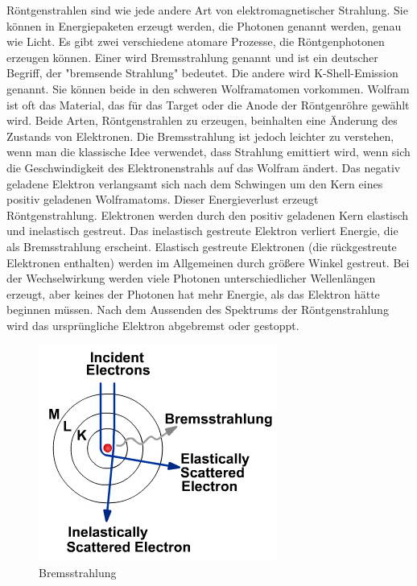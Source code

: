 Röntgenstrahlen sind wie jede andere Art von elektromagnetischer Strahlung. Sie können in Energiepaketen erzeugt werden, die Photonen genannt werden, genau wie Licht. Es gibt zwei verschiedene atomare Prozesse, die Röntgenphotonen erzeugen können. Einer wird Bremsstrahlung genannt und ist ein deutscher Begriff, der "bremsende Strahlung" bedeutet. Die andere wird K-Shell-Emission genannt. Sie können beide in den schweren Wolframatomen vorkommen. Wolfram ist oft das Material, das für das Target oder die Anode der Röntgenröhre gewählt wird.
Beide Arten, Röntgenstrahlen zu erzeugen, beinhalten eine Änderung des Zustands von Elektronen. Die Bremsstrahlung ist jedoch leichter zu verstehen, wenn man die klassische Idee verwendet, dass Strahlung emittiert wird, wenn sich die Geschwindigkeit des Elektronenstrahls auf das Wolfram ändert. Das negativ geladene Elektron verlangsamt sich nach dem Schwingen um den Kern eines positiv geladenen Wolframatoms. Dieser Energieverlust erzeugt Röntgenstrahlung. Elektronen werden durch den positiv geladenen Kern elastisch und inelastisch gestreut. Das inelastisch gestreute Elektron verliert Energie, die als Bremsstrahlung erscheint. Elastisch gestreute Elektronen (die rückgestreute Elektronen enthalten) werden im Allgemeinen durch größere Winkel gestreut. Bei der Wechselwirkung werden viele Photonen unterschiedlicher Wellenlängen erzeugt, aber keines der Photonen hat mehr Energie, als das Elektron hätte beginnen müssen. Nach dem Aussenden des Spektrums der Röntgenstrahlung wird das ursprüngliche Elektron abgebremst oder gestoppt.
\begin{figure}[htb]
  \centering  
  \includegraphics[scale=0.7]{img/Bremsstrahlung.jpg}
  \caption{Bremsstrahlung}
  \label{fig:Bremsstrahlung}
\end{figure}
